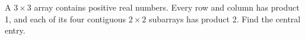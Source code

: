 A $3\times3$ array contains positive real numbers. Every row and column has product 1, and each of its four contiguous $2\times2$ subarrays has product 2. Find the central entry.
